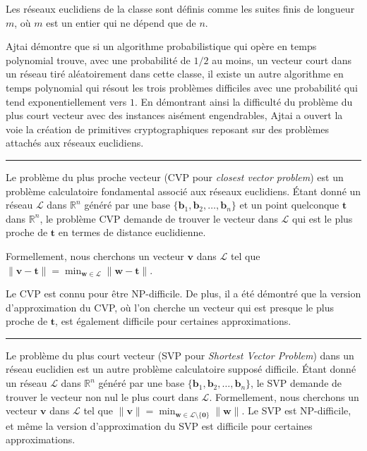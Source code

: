 Les réseaux euclidiens de la classe sont définis comme les suites finis de longueur $m$, où $m$ est un entier qui ne dépend que de $n$.

Ajtai démontre que si un algorithme probabilistique qui opère en temps polynomial trouve, avec une
probabilité de $1/2$ au moins, un vecteur court dans un réseau tiré aléatoirement dans cette classe,
il existe un autre algorithme en temps polynomial qui résout les trois problèmes difficiles avec une
probabilité qui tend exponentiellement vers $1$.
En démontrant ainsi la difficulté du problème du plus court vecteur avec des instances aisément
engendrables, Ajtai a ouvert la voie la création de primitives cryptographiques reposant sur des
problèmes attachés aux réseaux euclidiens.





\vskip1cm
\hrule
\vskip1cm
Le problème du plus proche vecteur (CVP pour \emph{closest vector problem}) est un problème calculatoire fondamental associé aux réseaux euclidiens. Étant donné un réseau $\mathcal{L}$ dans $\mathbb{R}^n$ généré par une base $\{\mathbf{b}_1, \mathbf{b}_2, \ldots, \mathbf{b}_n\}$ et un point quelconque $\mathbf{t}$ dans $\mathbb{R}^n$, le problème CVP demande de trouver le vecteur dans $\mathcal{L}$ qui est le plus proche de $\mathbf{t}$ en termes de distance euclidienne.

Formellement, nous cherchons un vecteur $\mathbf{v}$ dans $\mathcal{L}$ tel que $\|\mathbf{v}-\mathbf{t}\| = \min_{\mathbf{w} \in \mathcal{L}} \|\mathbf{w}-\mathbf{t}\|$.

Le CVP est connu pour être NP-difficile. De plus, il a été démontré que la version d'approximation du CVP, où l'on cherche un vecteur qui est presque le plus proche de $\mathbf{t}$, est également difficile pour certaines approximations. 

\vskip1cm
\hrule
\vskip1cm


Le problème du plus court vecteur (SVP pour \emph{Shortest Vector Problem}) dans un réseau euclidien est un autre problème calculatoire supposé difficile. Étant donné un réseau $\mathcal{L}$ dans $\mathbb{R}^n$ généré par une base $\{\mathbf{b}_1, \mathbf{b}_2, \ldots, \mathbf{b}_n\}$, le SVP demande de trouver le vecteur non nul le plus court dans $\mathcal{L}$. Formellement, nous cherchons un vecteur $\mathbf{v}$ dans $\mathcal{L}$ tel que $\|\mathbf{v}\| = \min_{\mathbf{w} \in \mathcal{L} \setminus \{ \mathbf{0} \}} \|\mathbf{w}\|$. Le SVP est NP-difficile, et même la version d'approximation du SVP est difficile pour certaines approximations.

